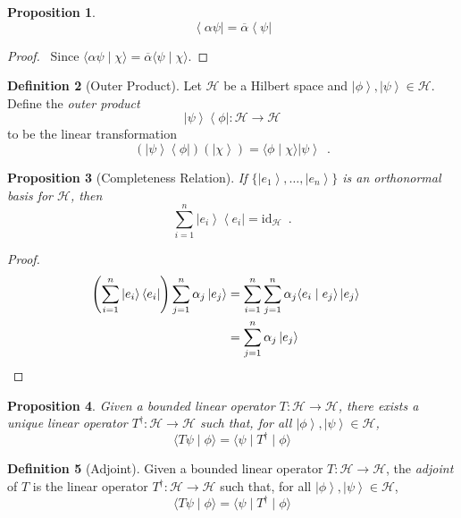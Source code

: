 \documentclass{book}
\let\qed\relax
\newtheorem{prop}{Proposition}[chapter]
\theoremstyle{definition}
\newtheorem{df}[prop]{Definition}
\newcommand{\bra}[1]{\ensuremath{\left\langle {#1} \right|}}
\newcommand{\id}[1]{\ensuremath{\mathrm{id}_{#1}}}
\newcommand{\ket}[1]{\ensuremath{\left| {#1} \right\rangle}}
\begin{document}
\begin{prop}
\[ \bra{\alpha \psi} = \overline{\alpha} \bra{\psi} \]
\end{prop}

\begin{proof}
\pf\ Since $\langle \alpha \psi \mid \chi \rangle = \overline{\alpha} \langle \psi \mid \chi \rangle$. \qed
\end{proof}

\begin{df}[Outer Product]
Let $\mathcal{H}$ be a Hilbert space and $\ket{\phi}, \ket{\psi} \in \mathcal{H}$. Define the \emph{outer product}
\[ \ket{\psi} \bra{\phi} : \mathcal{H} \rightarrow \mathcal{H} \]
to be the linear transformation
\[ (\ket{\psi} \bra{\phi})(\ket{\chi}) = \langle \phi \mid \chi \rangle \ket{\psi} \enspace . \]
\end{df}

\begin{prop}[Completeness Relation]
If $\{ \ket{e_1}, \ldots, \ket{e_n} \}$ is an orthonormal basis for $\mathcal{H}$, then
\[ \sum_{i=1}^n \ket{e_i} \bra{e_i} = \id{\mathcal{H}} \enspace . \]
\end{prop}

\begin{proof}
\pf
\begin{align*}
\left( \sum_{i=1}^n \ket{e_i} \bra{e_i} \right) \sum_{j=1}^n \alpha_j \ket{e_j}
& = \sum_{i=1}^n \sum_{j=1}^n \alpha_j \langle e_i \mid e_j \rangle \ket{e_j} \\
& = \sum_{j=1}^n \alpha_j \ket{e_j} & \qed
\end{align*}
\end{proof}

\begin{prop}
Given a bounded linear operator $T : \mathcal{H} \rightarrow \mathcal{H}$, there exists a unique linear operator $T^\dagger : \mathcal{H} \rightarrow \mathcal{H}$ such that, for all $\ket{\phi}, \ket{\psi} \in \mathcal{H}$,
\[ \langle T \psi \mid \phi \rangle = \langle \psi \mid T^\dagger \mid \phi \rangle \]
\end{prop}


\begin{df}[Adjoint]
Given a bounded linear operator $T : \mathcal{H} \rightarrow \mathcal{H}$, the \emph{adjoint} of $T$ is the linear operator $T^\dagger : \mathcal{H} \rightarrow \mathcal{H}$ such that, for all $\ket{\phi}, \ket{\psi} \in \mathcal{H}$,
\[ \langle T \psi \mid \phi \rangle = \langle \psi \mid T^\dagger \mid \phi \rangle \]
\end{df}
\end{document}
